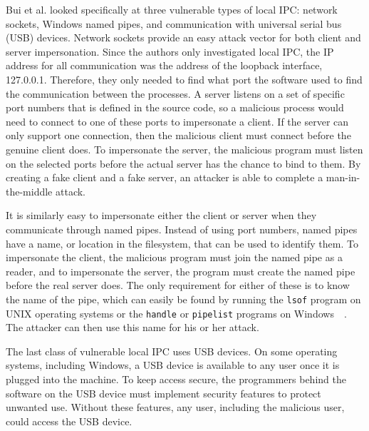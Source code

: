 Bui et al. looked specifically at three vulnerable types of local IPC: network sockets, Windows named pipes, and communication with universal serial bus (USB) devices.  Network sockets provide an easy attack vector for both client and server impersonation.  Since the authors only investigated local IPC, the IP address for all communication was the address of the loopback interface, 127.0.0.1.  Therefore, they only needed to find what port the software used to find the communication between the processes.  A server listens on a set of specific port numbers that is defined in the source code, so a malicious process would need to connect to one of these ports to impersonate a client.  If the server can only support one connection, then the malicious client must connect before the genuine client does.  To impersonate the server, the malicious program must listen on the selected ports before the actual server has the chance to bind to them.  By creating a fake client and a fake server, an attacker is able to complete a man-in-the-middle attack.

It is similarly easy to impersonate either the client or server when they communicate through named pipes.  Instead of using port numbers, named pipes have a name, or location in the filesystem, that can be used to identify them.  To impersonate the client, the malicious program must join the named pipe as a reader, and to impersonate the server, the program must create the named pipe before the real server does.  The only requirement for either of these is to know the name of the pipe, which can easily be found by running the \texttt{lsof} program on UNIX operating systems or the \texttt{handle} or \texttt{pipelist} programs on Windows~\cite{russinovich_2018}~\cite{markruss_sharkey_2016}.  The attacker can then use this name for his or her attack.

The last class of vulnerable local IPC uses USB devices.  On some operating systems, including Windows, a USB device is available to any user once it is plugged into the machine.  To keep access secure, the programmers behind the software on the USB device must implement security features to protect unwanted use.  Without these features, any user, including the malicious user, could access the USB device.

